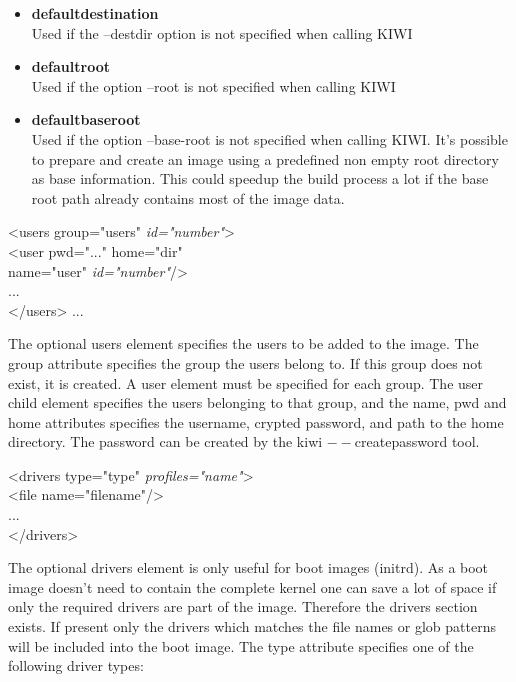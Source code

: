 \begin{itemize}
\item \textbf{defaultdestination}\\
      Used if the --destdir option is not specified when calling KIWI
\item \textbf{defaultroot}\\
      Used if the option --root is not specified when calling KIWI
\item \textbf{defaultbaseroot}\\
      Used if the option --base-root is not specified when
      calling KIWI. It's possible to prepare and create an image using a
      predefined non empty root directory as base information.
      This could speedup the build process a lot if the base root path
      already contains most of the image data.
\end{itemize}

\begin{Command}{12cm}
<users group="users" \textit{id="number"}>\\
\hspace*{1cm}<user pwd="..." home="dir"\\ 
\hspace*{1.5cm}name="user" \textit{id="number"}/>\\
\hspace*{1cm}...\\
</users>
...
\end{Command}

The optional users element specifies the users to be added to the image.
The group attribute specifies the group the users belong to. If this group
does not exist, it is created. A user element must be specified for
each group. The user child element specifies the users belonging to that
group, and the name, pwd and home attributes specifies the username,
crypted password, and path to the home directory. The password can be
created by the kiwi $--$createpassword tool.

\begin{Command}{12cm}
<drivers type="type" \textit{profiles="name"}>\\
\hspace*{1cm}<file name="filename"/>\\
\hspace*{1cm}...\\
</drivers>
\end{Command}

The optional drivers element is only useful for boot images (initrd).
As a boot image doesn't need to contain the complete kernel one can
save a lot of space if only the required drivers are part of the image.
Therefore the drivers section exists. If present only the drivers which
matches the file names or glob patterns will be included into the
boot image. The type attribute specifies one of the following driver
types:

